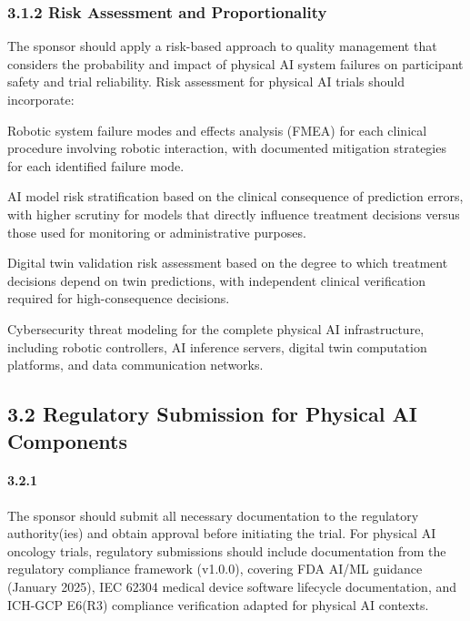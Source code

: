 \documentclass[11pt]{article}
\begin{document}
\subsubsection{3.1.2 Risk Assessment and Proportionality}

The sponsor should apply a risk-based approach to quality management that considers the probability and impact of physical AI system failures on participant safety and trial reliability. Risk assessment for physical AI trials should incorporate:

\begin{description}[leftmargin=2.5cm,style=sameline]

\item[(a)] Robotic system failure modes and effects analysis (FMEA) for each clinical procedure involving robotic interaction, with documented mitigation strategies for each identified failure mode.

\item[(b)] AI model risk stratification based on the clinical consequence of prediction errors, with higher scrutiny for models that directly influence treatment decisions versus those used for monitoring or administrative purposes.

\item[(c)] Digital twin validation risk assessment based on the degree to which treatment decisions depend on twin predictions, with independent clinical verification required for high-consequence decisions.

\item[(d)] Cybersecurity threat modeling for the complete physical AI infrastructure, including robotic controllers, AI inference servers, digital twin computation platforms, and data communication networks.

\end{description}

\subsection{3.2 Regulatory Submission for Physical AI Components}

\paragraph{3.2.1} The sponsor should submit all necessary documentation to the regulatory authority(ies) and obtain approval before initiating the trial. For physical AI oncology trials, regulatory submissions should include documentation from the regulatory compliance framework (v1.0.0), covering FDA AI/ML guidance (January 2025), IEC 62304 medical device software lifecycle documentation, and ICH-GCP E6(R3) compliance verification adapted for physical AI contexts.
\end{document}
